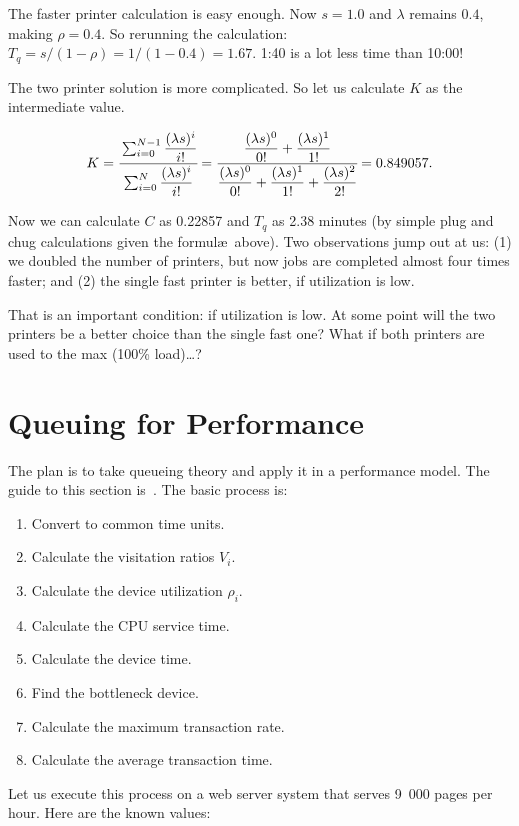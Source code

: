 \documentclass[a4paper]{report}
\begin{document}
The faster printer calculation is easy enough. Now $s = 1.0$ and $\lambda$ remains $0.4$, making $\rho = 0.4$. So rerunning the calculation: $T_{q} = s / (1 - \rho ) = 1 / (1 - 0.4 ) = 1.67$. 1:40 is a lot less time than 10:00! 

The two printer solution is more complicated. So let us calculate $K$ as the intermediate value. 

\[K = \cfrac{\sum_{i=0}^{N-1}\dfrac{(\lambda s)^{i}}{i!}}{{\sum_{i=0}^{N}\dfrac{(\lambda s)^{i}}{i!}}} = \cfrac{\dfrac{(\lambda s)^{0}}{0!} + \dfrac{(\lambda s)^{1}}{1!}}{\dfrac{(\lambda s)^{0}}{0!} + \dfrac{(\lambda s)^{1}}{1!} + \dfrac{(\lambda s)^{2}}{2!}} = 0.849057.\]

Now we can calculate $C$ as 0.22857 and $T_{q}$ as 2.38 minutes (by simple plug and chug calculations given the formul\ae\  above). Two observations jump out at us: (1) we doubled the number of printers, but now jobs are completed almost four times faster; and (2) the single fast printer is better, if utilization is low.

That is an important condition: if utilization is low. At some point will the two printers be a better choice than the single fast one? What if both printers are used to the max (100\% load)\ldots?

\section*{Queuing for Performance}

The plan is to take queueing theory and apply it in a performance model. The guide to this section is~\cite{williams-perf}. The basic process is:

\begin{enumerate}[noitemsep]
	\item Convert to common time units.
	\item Calculate the visitation ratios $V_{i}$.
	\item Calculate the device utilization $\rho_{i}$.
	\item Calculate the CPU service time.
	\item Calculate the device time.
	\item Find the bottleneck device.
	\item Calculate the maximum transaction rate.
	\item Calculate the average transaction time.
\end{enumerate}

Let us execute this process on a web server system that serves 9~000 pages per hour. Here are the known values:
\end{document}
